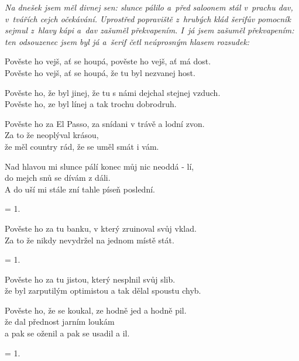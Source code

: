 
\textit{Na dnešek jsem měl divnej sen: slunce pálilo a~před saloonem stál v~prachu dav, v~tvářích cejch očekávání. Uprostřed popraviště z~hrubých klád šerifův pomocník sejmul z~hlavy kápi a~dav zašuměl překvapením. I~já jsem zašuměl překvapením: ten odsouzenec jsem byl já a~šerif četl neúprosným hlasem rozsudek:}

\ve{}
Pověste ho vejš, ať se houpá, pověste ho vejš, ať má dost.\\
Pověste ho vejš, ať se houpá, že tu byl nezvanej host.

\ve{}
Pověste ho, že byl jinej, že tu s námi dejchal stejnej vzduch.\\
Pověste ho, ze byl línej a tak trochu dobrodruh.

\ve{}
Pověste ho za El Passo, za snídani v trávě a lodní zvon.\\
Za to že neoplýval krásou,\\
že měl country rád, že se uměl smát i vám.

\cho{}
Nad hlavou mi slunce pálí konec můj nic neoddá - lí,\\
do mejch snů se dívám z dáli.\\
A do uší mi stále zní tahle píseň poslední.

\ve{} = 1.

\ve{}
Pověste ho za tu banku, v který zruinoval svůj vklad.\\
Za to že nikdy nevydržel na jednom místě stát.

\ve{} = 1.

\ve{}
Pověste ho za tu jistou, který nesplnil svůj slib.\\
že byl zarputilým optimistou a tak dělal spoustu chyb.

\ve{}
Pověste ho, že se koukal, ze hodně jed a hodně pil.\\
že dal přednost jarním loukám\\
a pak se oženil a pak se usadil a il.

\cho{}

\ve{} = 1.

\esong